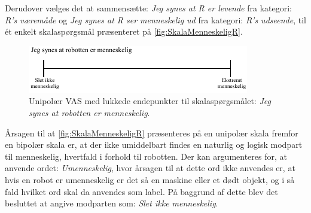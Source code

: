 Derudover vælges det at sammensætte: \textit{Jeg synes at R er levende} fra kategori: \textit{R's væremåde} og \textit{Jeg synes at R ser menneskelig ud} fra kategori: \textit{R's udseende}, til ét enkelt skalaspørgsmål præsenteret på \autoref{fig:SkalaMenneskeligR}.
%
\begin{figure}[H]
\centering
\includegraphics[width =\textwidth]{Figure/UdvalgteSkalaer/MenneskeligR} 
\caption{Unipolær VAS med lukkede endepunkter til skalaspørgsmålet: \textit{Jeg synes at robotten er menneskelig}.}
\label{fig:SkalaMenneskeligR}
\end{figure}
\noindent
%
Årsagen til at \autoref{fig:SkalaMenneskeligR} præsenteres på en unipolær skala fremfor en bipolær skala er, at der ikke umiddelbart findes en naturlig og logisk modpart til menneskelig, hvertfald i forhold til robotten. Der kan argumenteres for, at anvende ordet: \textit{Umenneskelig}, hvor årsagen til at dette ord ikke anvendes er, at hvis en robot er umenneskelig er det så en maskine eller et dødt objekt, og i så fald hvilket ord skal da anvendes som label. På baggrund af dette blev det besluttet at angive modparten som: \textit{Slet ikke menneskelig}.

